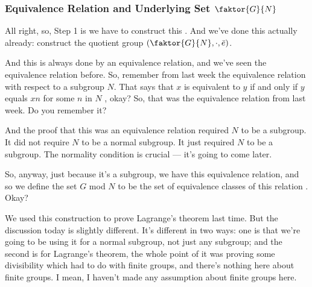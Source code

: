 \begin{proofWrapper}

\subsubsection{Equivalence Relation and Underlying Set \texorpdfstring{$\faktor{G}{N}$}{G/N}}

\begin{speech}[00:55:02 - 00:56:50]
All right, so, Step 1 is we have to construct this . And we've done this actually already: construct the quotient group $(\faktor{G}{N}, \cdot, \bar{e})$.

And this is always done by an equivalence relation, and we've seen the equivalence relation before. So, remember from last week the equivalence relation with respect to a subgroup $N$. That says that $x$ is equivalent to $y$ if and only if $y$ equals $x n$ for some $n$ in $N$ , okay? So, that was the equivalence relation from last week. Do you remember it?

And the proof that this was an equivalence relation required $N$ to be a subgroup. It did not require $N$ to be a normal subgroup. It just required $N$ to be a subgroup. The normality condition is crucial --- it's going to come later.

So, anyway, just because it's a subgroup, we have this equivalence relation, and so we define the set $G$ mod $N$ to be the set of equivalence classes of this relation . Okay?

We used this construction to prove Lagrange's theorem last time. But the discussion today is slightly different. It's different in two ways: one is that we're going to be using it for a normal subgroup, not just any subgroup; and the second is for Lagrange's theorem, the whole point of it was proving some divisibility which had to do with finite groups, and there's nothing here about finite groups. I mean, I haven't made any assumption about finite groups here.
\end{speech}


\end{proofWrapper}
